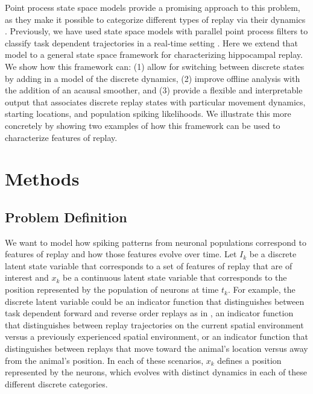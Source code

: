 \documentclass[conference]{IEEEtran}
\begin{document}
Point process state space models provide a promising approach to this problem, as they make it possible to categorize different types of replay via their dynamics \cite{DengRapidclassificationhippocampal2016, EdenCharacterizingComplexMultiScale2018}. Previously, we have used state space models with parallel point process filters to classify task dependent trajectories in a real-time setting \cite{DengRapidclassificationhippocampal2016}. Here we extend that model to a general state space framework for characterizing hippocampal replay. We show how this framework can: (1) allow for switching between discrete states by adding in a model of the discrete dynamics, (2) improve offline analysis with the addition of an acausal smoother, and (3) provide a flexible and interpretable output that associates discrete replay states with particular movement dynamics, starting locations, and population spiking likelihoods. We illustrate this more concretely by showing two examples of how this framework can be used to characterize features of replay.

\section{Methods}
\subsection{Problem Definition}
We want to model how spiking patterns from neuronal populations correspond to features of replay and how those features evolve over time. Let $I_{k}$ be a discrete latent state variable that corresponds to a set of features of replay that are of interest and $x_{k}$ be a continuous latent state variable that corresponds to the position represented by the population of neurons at time $t_{k}$. For example, the discrete latent variable could be an indicator function that distinguishes between task dependent forward and reverse order replays as in \cite{DengRapidclassificationhippocampal2016}, an indicator function that distinguishes between replay trajectories on the current spatial environment versus a previously experienced spatial environment, or an indicator function that distinguishes between replays that move toward the animal's location versus away from the animal's position. In each of these scenarios, $x_{k}$ defines a position represented by the neurons, which evolves with distinct dynamics in each of these different discrete categories.
\end{document}
